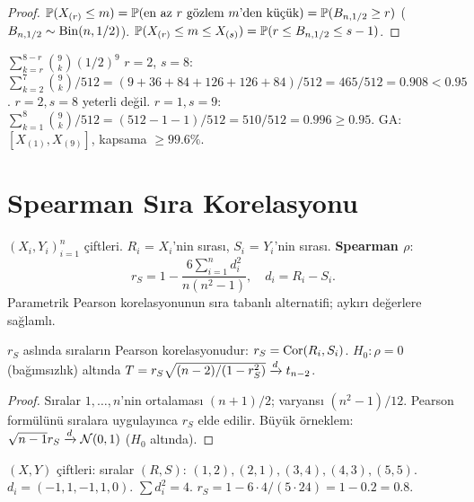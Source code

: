 \begin{proof}
$\mathbb{P}(X_{(r)}\leq m) = \mathbb{P}(\text{en az } r \text{ gözlem } m\text{'den küçük}) = \mathbb{P}(B_{n,1/2}\geq r)$ ($B_{n,1/2}\sim\operatorname{Bin}(n,1/2)$). $\mathbb{P}(X_{(r)}\leq m\leq X_{(s)}) = \mathbb{P}(r\leq B_{n,1/2}\leq s-1)$.
\end{proof}

\begin{ornek}[Medyan GA, $n=9$, $\alpha=0.05$]
$\sum_{k=r}^{8-r}\binom{9}{k}(1/2)^9$ $r=2$, $s=8$: $\sum_{k=2}^7\binom{9}{k}/512=(9+36+84+126+126+84)/512=465/512=0.908<0.95$. $r=2,s=8$ yeterli değil. $r=1,s=9$: $\sum_{k=1}^8\binom{9}{k}/512=(512-1-1)/512=510/512=0.996\geq0.95$. GA: $[X_{(1)},X_{(9)}]$, kapsama $\geq99.6\%$.
\end{ornek}

\section{Spearman Sıra Korelasyonu}
\label{sec:spearman}

\begin{tanim}\label{def:spearman}
$(X_i,Y_i)_{i=1}^n$ çiftleri. $R_i$ = $X_i$'nin sırası, $S_i$ = $Y_i$'nin sırası. \textbf{Spearman $\rho$}:
\[
  r_S = 1 - \frac{6\sum_{i=1}^n d_i^2}{n(n^2-1)}, \quad d_i = R_i - S_i.
\]
Parametrik Pearson korelasyonunun sıra tabanlı alternatifi; aykırı değerlere sağlamlı.
\end{tanim}

\begin{teorem}
$r_S$ aslında sıraların Pearson korelasyonudur: $r_S = \operatorname{Cor}(R_i,S_i)$. $H_0:\rho=0$ (bağımsızlık) altında $T=r_S\sqrt{(n-2)/(1-r_S^2)}\xrightarrow{d} t_{n-2}$.
\end{teorem}

\begin{proof}
Sıralar $1,\ldots,n$'nin ortalaması $(n+1)/2$; varyansı $(n^2-1)/12$. Pearson formülünü sıralara uygulayınca $r_S$ elde edilir. Büyük örneklem: $\sqrt{n-1}r_S\xrightarrow{d}\mathcal{N}(0,1)$ ($H_0$ altında).
\end{proof}

\begin{ornek}
$(X,Y)$ çiftleri: sıralar $(R,S)$: $(1,2),(2,1),(3,4),(4,3),(5,5)$. $d_i=(-1,1,-1,1,0)$. $\sum d_i^2=4$. $r_S=1-6\cdot4/(5\cdot24)=1-0.2=0.8$.
\end{ornek}

